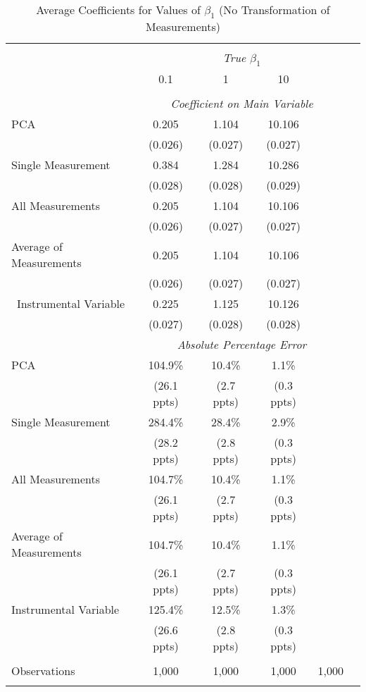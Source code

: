 \begin{table}[!htbp] \centering
  \caption{Average Coefficients for Values of $\beta_1$ (No Transformation of Measurements) \label{sim_beta1_5_noexp}}
\begin{tabular}{@{\extracolsep{5pt}}lccccc}
\\[-1.8ex]\hline
\hline \\[-1.8ex]
& \multicolumn{4}{c}{\textit{True $\beta_1$}} \
\cr \
\\[-1.8ex] & 0.1 & 1 & 10\\
\hline \\[-1.8ex]
& \multicolumn{4}{c}{\textit{Coefficient on Main Variable}} \\
 PCA & 0.205 & 1.104 & 10.106  \\
  & (0.026) & (0.027) & (0.027)\\
  Single Measurement & 0.384 & 1.284 & 10.286  \\
& (0.028) & (0.028) & (0.029)\\
 All Measurements & 0.205 & 1.104 & 10.106  \\
  & (0.026) & (0.027) & (0.027)\\
 Average of Measurements & 0.205 & 1.104 & 10.106  \\
  & (0.026) & (0.027) & (0.027)\\\
  Instrumental Variable & 0.225 & 1.125 & 10.126 \\
& (0.027) & (0.028) & (0.028) \\
& \multicolumn{4}{c}{\textit{Absolute Percentage Error}} \\
  PCA & 104.9\% & 10.4\% & 1.1\%  \\
   & (26.1 ppts) & (2.7 ppts) & (0.3 ppts)\\
   Single Measurement & 284.4\% & 28.4\% & 2.9\%  \\
& (28.2 ppts) & (2.8 ppts) & (0.3 ppts) \\
All Measurements & 104.7\% & 10.4\% & 1.1\%  \\
  & (26.1 ppts) & (2.7 ppts) & (0.3 ppts)\\
  Average of Measurements & 104.7\% & 10.4\% & 1.1\%  \\
  & (26.1 ppts) & (2.7 ppts) & (0.3 ppts)\\
  Instrumental Variable & 125.4\% & 12.5\% & 1.3\%  \\
& (26.6 ppts) & (2.8 ppts) & (0.3 ppts)\\

\hline \\[-1.8ex]
 Observations & 1,000 & 1,000 & 1,000 & 1,000 &\\
\hline
\hline \\[-1.8ex]
\end{tabular}
\end{table}